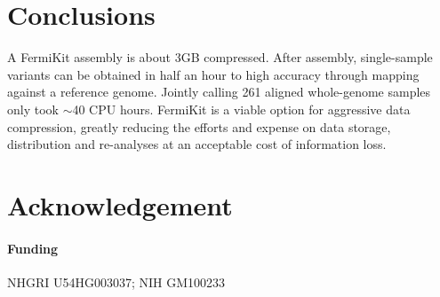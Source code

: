 \documentclass{bioinfo}
\begin{document}
\section{Conclusions}

A FermiKit assembly is about 3GB compressed. After assembly, single-sample
variants can be obtained in half an hour to high accuracy through mapping
against a reference genome. Jointly calling 261 aligned whole-genome samples only took
$\sim$40 CPU hours.  FermiKit is a viable option for aggressive data
compression, greatly reducing the efforts and expense on data storage,
distribution and re-analyses at an acceptable cost of information loss.

\section*{Acknowledgement}
\paragraph{Funding\textcolon} NHGRI U54HG003037; NIH GM100233


\end{document}
